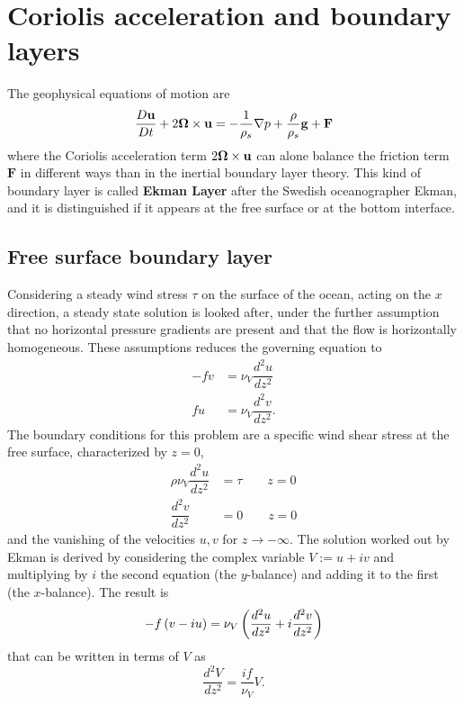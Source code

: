 \section{Coriolis acceleration and boundary layers}
The geophysical equations of motion are
\begin{equation*}
\dfrac{D\mathbf{u}}{Dt}+2\boldsymbol{\Omega}\times\mathbf{u}=-\dfrac{1}{\rho_{s}}\nabla p +\dfrac{\rho}{\rho_{s}}\mathbf{g}+\mathbf{F}
\end{equation*}
where the Coriolis acceleration term $2\boldsymbol{\Omega}\times\mathbf{u}$ can alone balance the friction term $\mathbf{F}$ in different ways than in the inertial boundary layer theory. This kind of boundary layer is called \textbf{Ekman Layer} after the Swedish oceanographer Ekman, and it is distinguished if it appears at the free surface or at the bottom interface.
\subsection{Free surface boundary layer}
Considering a steady wind stress $\tau$ on the surface of the ocean, acting on the $x$ direction, a steady state solution is looked after, under the further assumption that no horizontal pressure gradients are present and that the flow is horizontally homogeneous. These assumptions reduces the governing equation to
\begin{align*}
-fv&=\nu_{V}\dfrac{d^{2}u}{dz^{2}}\\
 fu&=\nu_{V}\dfrac{d^{2}v}{dz^{2}}.
\end{align*}
The boundary conditions for this problem are a specific wind shear stress at the free surface, characterized by $z=0$,
\begin{align*}
\rho\nu_{V}\dfrac{d^{2}u}{dz^{2}}&=\tau\qquad z=0\\
\dfrac{d^{2}v}{dz^{2}}&=0\qquad z=0
\end{align*}
and the vanishing of the velocities $u,v$ for $z\rightarrow-\infty$. The solution worked out by Ekman is derived by considering the complex variable $V:=u+iv$ and multiplying by $i$ the second equation (the $y$-balance) and adding it to the first (the $x$-balance). The result is 
\begin{equation*}
-f\left( v-iu \right)=\nu_{V}\left( \dfrac{d^{2}u}{dz^{2}}+i\dfrac{d^{2}v}{dz^{2}} \right)
\end{equation*}
that can be written in terms of $V$ as
\begin{equation}
\dfrac{d^{2}V}{dz^{2}}=\dfrac{if}{\nu_{V}}V.
\end{equation}
